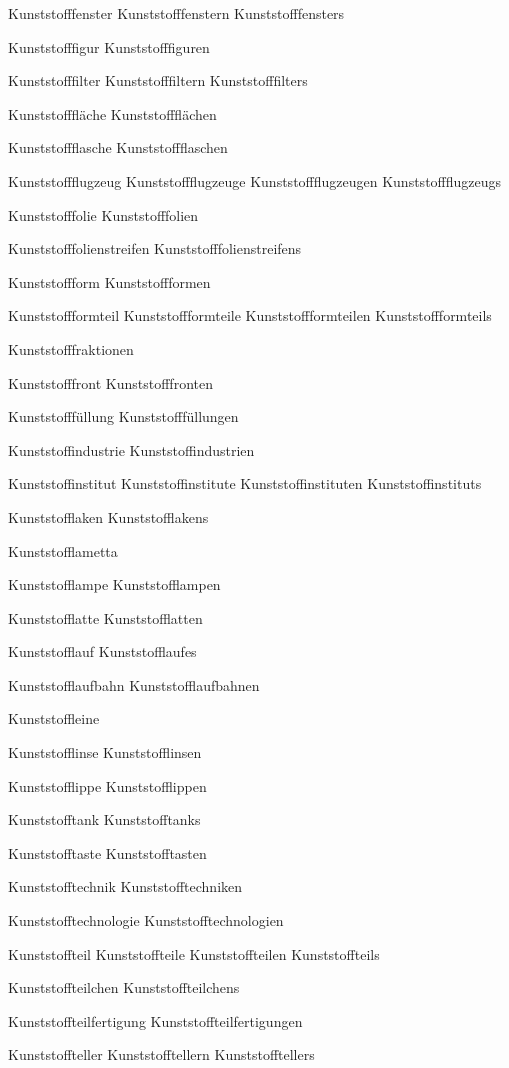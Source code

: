 Kunststofffenster
Kunststofffenstern
Kunststofffensters

Kunststofffigur
Kunststofffiguren

Kunststofffilter
Kunststofffiltern
Kunststofffilters

Kunststofffläche
Kunststoffflächen

Kunststoffflasche
Kunststoffflaschen

Kunststoffflugzeug
Kunststoffflugzeuge
Kunststoffflugzeugen
Kunststoffflugzeugs

Kunststofffolie
Kunststofffolien

Kunststofffolienstreifen
Kunststofffolienstreifens

Kunststoffform
Kunststoffformen

Kunststoffformteil
Kunststoffformteile
Kunststoffformteilen
Kunststoffformteils

Kunststofffraktionen

Kunststofffront
Kunststofffronten

Kunststofffüllung
Kunststofffüllungen

Kunststoffindustrie
Kunststoffindustrien

Kunststoffinstitut
Kunststoffinstitute
Kunststoffinstituten
Kunststoffinstituts

Kunststofflaken
Kunststofflakens

Kunststofflametta

Kunststofflampe
Kunststofflampen

Kunststofflatte
Kunststofflatten

Kunststofflauf
Kunststofflaufes

Kunststofflaufbahn
Kunststofflaufbahnen

Kunststoffleine

Kunststofflinse
Kunststofflinsen

Kunststofflippe
Kunststofflippen

Kunststofftank
Kunststofftanks

Kunststofftaste
Kunststofftasten

Kunststofftechnik
Kunststofftechniken

Kunststofftechnologie
Kunststofftechnologien

Kunststoffteil
Kunststoffteile
Kunststoffteilen
Kunststoffteils

Kunststoffteilchen
Kunststoffteilchens

Kunststoffteilfertigung
Kunststoffteilfertigungen

Kunststoffteller
Kunststofftellern
Kunststofftellers

